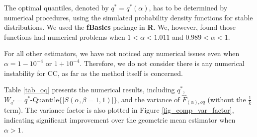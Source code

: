 \documentclass[oneside,10pt]{article}
\begin{document}
The optimal quantiles, denoted by $q^* = q^*(\alpha)$, has to be determined by numerical procedures, using the simulated probability density functions for stable distributions. We used the \textbf{fBasics} package in \textbf{R}. We, however, found those functions had numerical problems when $1<\alpha<1.011$ and $0.989<\alpha<1$.

For all other estimators, we have not noticed any numerical issues even when $\alpha = 1-10^{-4}$ or $1+10^{-4}$. Therefore, we do not consider there is any numerical instability for CC, as far as the method itself is concerned.



Table \ref{tab_oq} presents the numerical results, including $q^*$,  $W_{q^*} = q^*\text{-Quantile}\{|S(\alpha,\beta=1,1)|\}$, and the variance of $\hat{F}_{(\alpha),oq}$ (without the $\frac{1}{k}$ term). The variance factor is also plotted in Figure \ref{fig_comp_var_factor}, indicating significant improvement over the geometric mean estimator when $\alpha>1$.
\end{document}
